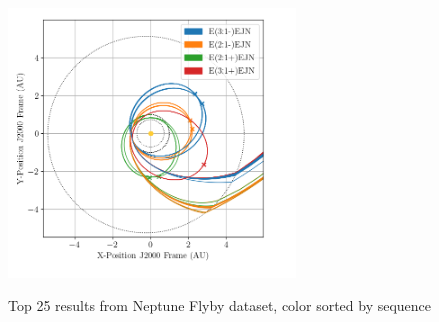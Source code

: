\documentclass[letterpaper, preprint, paper,11pt]{AAS}	%
\begin{document}
\begin{figure}[h]
    \centering
    \includegraphics[width=3in]{./fig/tridentFamilies.png}
    \label{fig:tridFam}
    \caption{Top 25 results from Neptune Flyby dataset, color sorted by sequence}
\end{figure}


\clearpage
\end{document}
